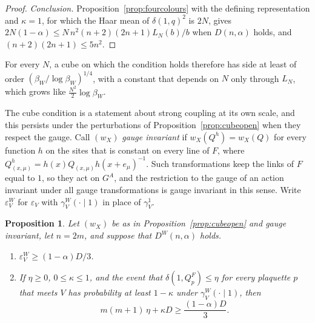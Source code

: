 \documentclass[aps,prd,twocolumn,superscriptaddress,nofootinbib,longbibliography,floatfix,amsmath,amssymb,10pt]{revtex4-2}
\newtheorem{proposition}[theorem]{Proposition}
\theoremstyle{definition}
\theoremstyle{remark}
\begin{document}
\begin{proof}
\emph{Conclusion.} Proposition~\ref{prop:fourcolours} with the defining
representation and $\kappa=1$, for which the Haar mean of $\delta(1,q)^2$ is
$2N$, gives $2N(1-\alpha)\le N\,n^2(n+2)(2n+1)L_N(b)/b$ when $D(n,\alpha)$
holds, and $(n+2)(2n+1)\le5n^2$.
\end{proof}

For every $N$, a cube on which the condition holds therefore has side at
least of order $(\beta_W/\log\beta_W)^{1/4}$, with a constant that depends on
$N$ only through $L_N$, which grows like $\frac{N^2}2\log\beta_W$.

The cube condition is a statement about strong coupling at its own scale,
and this persists under the perturbations of
Proposition~\ref{prop:cubeopen} when they respect the gauge. Call $(w_X)$
\emph{gauge invariant} if $w_X(Q^h)=w_X(Q)$ for every function $h$ on the
sites that is constant on every line of $F$, where
$Q^h_{(x,\mu)}=h(x)Q_{(x,\mu)}h(x+e_\mu)^{-1}$. Such transformations keep
the links of $F$ equal to $1$, so they act on $G^A$, and the restriction to
the gauge of an action invariant under all gauge transformations is gauge
invariant in this sense. Write $\varepsilon^W_V$ for $\varepsilon_V$ with
$\gamma^W_V(\cdot\mid1)$ in place of $\gamma^1_V$.

\begin{proposition}\label{prop:smallfield}
Let $(w_X)$ be as in Proposition~\ref{prop:cubeopen} and gauge invariant,
let $n=2m$, and suppose that $D^W(n,\alpha)$ holds.
\begin{enumerate}[label=\textup{(\roman*)},leftmargin=*]
\item $\varepsilon^W_V\ge(1-\alpha)D/3$.
\item If $\eta\ge0$, $0\le\kappa\le1$, and the event that
$\delta(1,Q^F_p)\le\eta$ for every plaquette $p$ that meets $V$ has
probability at least $1-\kappa$ under $\gamma^W_V(\cdot\mid1)$, then
\[
m(m+1)\,\eta+\kappa D\ge\frac{(1-\alpha)D}3 .
\]
\end{enumerate}
\end{proposition}
\end{document}
